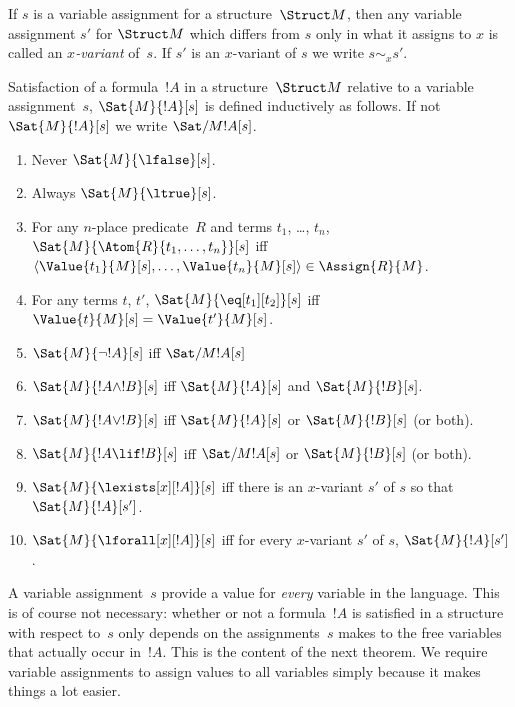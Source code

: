 \documentclass[../../include/open-logic-section]{subfiles}
\begin{document}
\begin{defn}[$x$-Variant]
If $s$ is a variable assignment for a structure~$\Struct M$, then any
variable assignment $s'$ for $\Struct M$ which differs from $s$ only
in what it assigns to $x$ is called an \emph{$x$-variant} of~$s$.  If
$s'$ is an $x$-variant of $s$ we write $s \sim_x s'$.
\end{defn}

\begin{defn}[Satisfaction]
Satisfaction of a formula~$!A$ in a structure~$\Struct M$ relative to
a variable assignment~$s$, $\Sat{M}{!A}[s]$ is defined inductively as
follows. If not $\Sat{M}{!A}[s]$ we write $\Sat/{M}{!A}[s]$.
\begin{enumerate}
\item Never $\Sat{M}{\lfalse}[s]$.
\item Always $\Sat{M}{\ltrue}[s]$.
\item For any $n$-place predicate~$R$ and terms $t_1$, \dots, $t_n$,
  $\Sat{M}{\Atom{R}{t_1, \dots, t_n}}[s]$ iff $\langle \Value{t_1}{M}[s],
  \dots, \Value{t_n}{M}[s] \rangle \in \Assign{R}{M}$.
\item For any terms $t$, $t'$, $\Sat{M}{\eq[t_1][t_2]}[s]$ iff
  $\Value{t}{M}[s] = \Value{t'}{M}[s]$.
\item $\Sat{M}{\lnot !A}[s]$ iff $\Sat/{M}{!A}[s]$
\item $\Sat{M}{!A \land !B}[s]$ iff $\Sat{M}{!A}[s]$ and $\Sat{M}{!B}[s]$.
\item $\Sat{M}{!A \lor !B}[s]$ iff $\Sat{M}{!A}[s]$ or
  $\Sat{M}{!B}[s]$ (or both).
\item $\Sat{M}{!A \lif !B}[s]$ iff $\Sat/{M}{!A}[s]$ or
  $\Sat{M}{!B}[s]$ (or both).
\item $\Sat{M}{\lexists[x][!A]}[s]$ iff there is an $x$-variant $s'$
  of $s$ so that $\Sat{M}{!A}[s']$.
\item $\Sat{M}{\lforall[x][!A]}[s]$ iff for every $x$-variant $s'$ of
  $s$, $\Sat{M}{!A}[s']$.
\end{enumerate}
\end{defn}

\begin{explain}
A variable assignment~$s$ provide a value for \emph{every} variable in
the language. This is of course not necessary: whether or not a
formula~$!A$ is satisfied in a structure with respect to~$s$ only
depends on the assignments~$s$ makes to the free variables that
actually occur in~$!A$.  This is the content of the next theorem.  We
require variable assignments to assign values to all variables simply
because it makes things a lot easier.
\end{explain}
\end{document}
